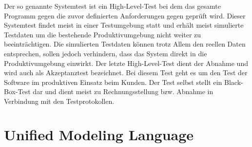 Der so genannte Systemtest ist ein High-Level-Test bei dem das gesamte Programm gegen die zuvor definierten Anforderungen gegen geprüft wird. Dieser Systemtest findet meist in einer Testumgebung statt und erhält meist simulierte Testdaten um die bestehende Produktivumgebung nicht weiter zu beeinträchtigen. Die simulierten Testdaten können trotz Allem den reellen Daten entsprechen, sollen jedoch verhindern, dass das System direkt in die Produktivumgebung einwirkt.
Der letzte High-Level-Test dient der Abnahme und wird auch als Akzeptanztest bezeichnet. Bei diesem Test geht es um den Test der Software im produktiven Einsatz beim Kunden. Der Test selbst stellt ein Black-Box-Test dar und dient meist zu Rechnungsstellung bzw. Abnahme in Verbindung mit den Testprotokollen.

\section{Unified Modeling Language}
\label{sec:uml}

